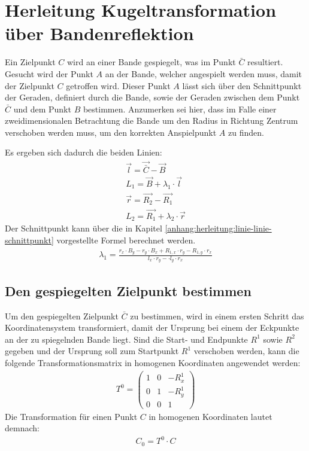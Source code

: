 \section{Herleitung Kugeltransformation über Bandenreflektion}\label{anhang:herleitung:bandenreflektion}
Ein Zielpunkt $C$ wird an einer Bande gespiegelt, was im Punkt $\bar{C}$ resultiert. Gesucht wird der Punkt $A$ an
der Bande, welcher angespielt werden muss, damit der Zielpunkt $C$ getroffen wird. Dieser Punkt $A$ lässt sich über
den Schnittpunkt der Geraden, definiert durch die Bande, sowie der Geraden zwischen dem Punkt $\bar{C}$ und dem Punkt
$B$ bestimmen. Anzumerken sei hier, dass im Falle einer zweidimensionalen Betrachtung die Bande um den Radius in Richtung
Zentrum verschoben werden muss, um den korrekten Anspielpunkt $A$ zu finden.

Es ergeben sich dadurch die beiden Linien:
\begin{align}
    \vec{l} = \vec{\bar{C}} - \vec{B}\\
    L_1 = \vec{B} + \lambda_1 \cdot \vec{l}\\
    \vec{r} = \vec{R_2} - \vec{R_1}\\
    L_2 = \vec{R_1} + \lambda_2 \cdot \vec{r}
\end{align}
Der Schnittpunkt kann über die in Kapitel \ref{anhang:herleitung:linie-linie-schnittpunkt} vorgestellte Formel
berechnet werden.
\begin{align}
    \lambda_1 = \frac{r_x \cdot B_y - r_y \cdot B_x + R_{1,x} \cdot r_y - R_{1,y} \cdot r_x}{l_x \cdot r_y - \cdot l_y \cdot r_x}
\end{align}

\subsection{Den gespiegelten Zielpunkt bestimmen}\label{anhang:herleitung:bandenreflektion:zielpunkt}
Um den gespiegelten Zielpunkt $\bar{C}$ zu bestimmen, wird in einem ersten Schritt das Koordinatensystem transformiert, damit
der Ursprung bei einem der Eckpunkte an der zu spiegelnden Bande liegt. Sind die Start- und Endpunkte $R^1$ sowie $R^2$
gegeben und der Ursprung soll zum Startpunkt $R^1$ verschoben werden, kann die folgende Transformationsmatrix in
homogenen Koordinaten angewendet werden:
\begin{align}
    T^0 = \begin{pmatrix}1 & 0 & -R^1_x\\0 & 1 & -R^1_y\\0 & 0 & 1\end{pmatrix}
\end{align}
Die Transformation für einen Punkt $C$ in homogenen Koordinaten lautet demnach:
\begin{align}
    C_0 = T^0 \cdot C
\end{align}

